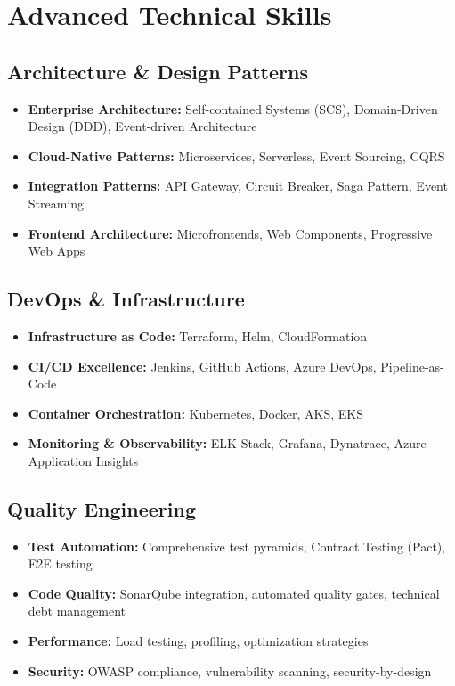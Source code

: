 \documentclass[11pt,a4paper]{article}
\begin{document}
\section{Advanced Technical Skills}

\subsection{Architecture \& Design Patterns}
\begin{itemize}[leftmargin=12pt,topsep=0pt,itemsep=0pt]
\item \textbf{Enterprise Architecture:} Self-contained Systems (SCS), Domain-Driven Design (DDD), Event-driven Architecture
\item \textbf{Cloud-Native Patterns:} Microservices, Serverless, Event Sourcing, CQRS
\item \textbf{Integration Patterns:} API Gateway, Circuit Breaker, Saga Pattern, Event Streaming
\item \textbf{Frontend Architecture:} Microfrontends, Web Components, Progressive Web Apps
\end{itemize}

\subsection{DevOps \& Infrastructure}
\begin{itemize}[leftmargin=12pt,topsep=0pt,itemsep=0pt]
\item \textbf{Infrastructure as Code:} Terraform, Helm, CloudFormation
\item \textbf{CI/CD Excellence:} Jenkins, GitHub Actions, Azure DevOps, Pipeline-as-Code
\item \textbf{Container Orchestration:} Kubernetes, Docker, AKS, EKS
\item \textbf{Monitoring \& Observability:} ELK Stack, Grafana, Dynatrace, Azure Application Insights
\end{itemize}

\subsection{Quality Engineering}
\begin{itemize}[leftmargin=12pt,topsep=0pt,itemsep=0pt]
\item \textbf{Test Automation:} Comprehensive test pyramids, Contract Testing (Pact), E2E testing
\item \textbf{Code Quality:} SonarQube integration, automated quality gates, technical debt management
\item \textbf{Performance:} Load testing, profiling, optimization strategies
\item \textbf{Security:} OWASP compliance, vulnerability scanning, security-by-design
\end{itemize}
\end{document}
